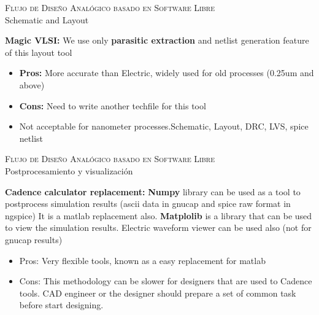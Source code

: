 \documentclass[ps,clariphy]{prosper}
\begin{document}
\begin{slide}{ \textsc{{\tiny Flujo de Dise\~no Anal\'ogico basado en Software Libre}}\\ Schematic and Layout}
  \vspace{-0.5cm}
  \tiny{
    \textbf{Magic VLSI:}
    \newline We use only \textbf{parasitic extraction} and netlist generation feature of this layout tool
\begin{itemize}
      	\item \textbf{Pros:} More accurate than Electric, widely used for old processes (0.25um and above)
\item \textbf{Cons:} Need to write another techfile for this tool
\item Not acceptable for nanometer processes.Schematic, Layout, DRC, LVS, spice netlist
\end{itemize}
  }
\end{slide}



\begin{slide}{ \textsc{{\tiny Flujo de Dise\~no Anal\'ogico basado en Software Libre }}\\Postprocesamiento y visualizaci\'on }
  \vspace{-0.5cm}
\tiny{
  \textbf{Cadence calculator replacement:}
\newline \textbf{Numpy} library can be used as a tool to postprocess simulation results (ascii data in gnucap and spice raw format in ngspice) It is a matlab replacement also. 
\newline \textbf{Matplolib} is a library that can be used to view the simulation results. Electric waveform viewer can be used also (not for gnucap results)

\begin{itemize}
      	\item Pros: Very flexible tools, known as a easy replacement for matlab 
      	\item Cons: This methodology can be slower for designers that are used to Cadence tools. CAD engineer or the designer should prepare a set of common task before start designing.
\end{itemize}
}
\end{slide}
\end{document}

